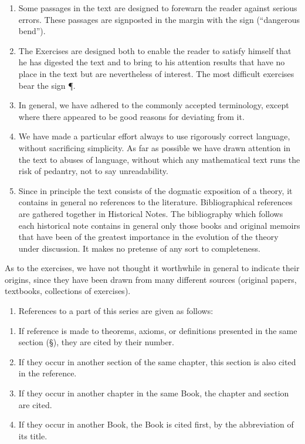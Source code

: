 \begin{enumerate}
\def\labelenumi{\arabic{enumi}.}
\setcounter{enumi}{5}
\item
  Some passages in the text are designed to forewarn the reader against serious errors. These passages are signposted in the margin with the sign (``dangerous bend'').
\item
  The Exercises are designed both to enable the reader to satisfy himself that he has digested the text and to bring to his attention results that have no place in the text but are nevertheless of interest. The most difficult exercises bear the sign ¶.
\item
  In general, we have adhered to the commonly accepted terminology, except where there appeared to be good reasons for deviating from it.
\item
  We have made a particular effort always to use rigorously correct language, without sacrificing simplicity. As far as possible we have drawn attention in the text to abuses of language, without which any mathematical text runs the risk of pedantry, not to say unreadability.
\item
  Since in principle the text consists of the dogmatic exposition of a theory, it contains in general no references to the literature. Bibliographical references are gathered together in Historical Notes. The bibliography which follows each historical note contains in general only those books and original memoirs that have been of the greatest importance in the evolution of the theory under discussion. It makes no pretense of any sort to completeness.
\end{enumerate}

As to the exercises, we have not thought it worthwhile in general to indicate their origins, since they have been drawn from many different sources (original papers, textbooks, collections of exercises).

\begin{enumerate}
\def\labelenumi{\arabic{enumi}.}
\setcounter{enumi}{10}
\tightlist
\item
  References to a part of this series are given as follows:
\end{enumerate}

\begin{enumerate}
\def\labelenumi{\alph{enumi})}
\item
  If reference is made to theorems, axioms, or definitions presented in the same section (§), they are cited by their number.
\item
  If they occur in another section of the same chapter, this section is also cited in the reference.
\item
  If they occur in another chapter in the same Book, the chapter and section are cited.
\item
  If they occur in another Book, the Book is cited first, by the abbreviation of its title.
\end{enumerate}

